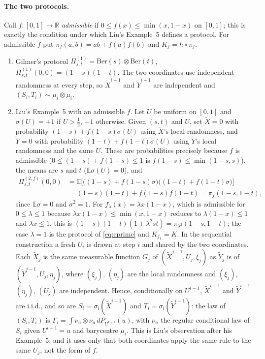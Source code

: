 \documentclass[11pt]{article}
\theoremstyle{plain}
\theoremstyle{definition}
\theoremstyle{remark}
\newcommand{\R}{\mathbb{R}}
\newcommand{\E}{\mathbb{E}}
\begin{document}
\paragraph{The two protocols.}
Call $f:[0,1]\to\R$ \emph{admissible} if $0\le f(x)\le\min(x,1-x)$ on
$[0,1]$; this is exactly the condition under which Liu's Example~5 defines a
protocol.  For admissible $f$ put $\pi_f(a,b)=ab+f(a)f(b)$ and $K_f=h\circ\pi_f$.
\begin{enumerate}[label=(\roman*),nosep]
\item Gilmer's protocol $\Pi^{(1)}_{s,t}=\mathrm{Ber}(s)\otimes\mathrm{Ber}(t)$,
$\Pi^{(1)}_{s,t}(0,0)=(1-s)(1-t)$.  The two coordinates use independent
randomness at every step, so $\tilde X^{i-1}$ and $\tilde Y^{i-1}$ are
independent and $(S_i,T_i)\sim\mu_i\otimes\mu_i$.
\item Liu's Example~5 with an admissible $f$.  Let $U$ be uniform on $[0,1]$
and $\sigma(U)=+1$ if $U>\tfrac12$, $-1$ otherwise.  Given $(s,t)$ and $U$,
set $\tilde X=0$ with probability $(1-s)+f(1-s)\sigma(U)$ using $\tilde X$'s
local randomness, and $\tilde Y=0$ with probability $(1-t)+f(1-t)\sigma(U)$
using $\tilde Y$'s local randomness and the same $U$.  These are
probabilities precisely because $f$ is admissible
($0\le(1-s)\pm f(1-s)\le1$ is $f(1-s)\le\min(1-s,s)$), the means are $s$ and
$t$ ($\E\sigma(U)=0$), and
\begin{align*}
  \Pi^{(2,f)}_{s,t}(0,0)
  &=\E\bigl[\bigl((1-s)+f(1-s)\sigma\bigr)\bigl((1-t)+f(1-t)\sigma\bigr)\bigr]\\
  &=(1-s)(1-t)+f(1-s)f(1-t)=\pi_f(1-s,1-t),
\end{align*}
since $\E\sigma=0$ and $\sigma^2=1$.  For $f_\lambda(x)=\lambda x(1-x)$,
which is admissible for $0\le\lambda\le1$ because
$\lambda x(1-x)\le\min(x,1-x)$ reduces to $\lambda(1-x)\le1$ and
$\lambda x\le1$, this is
$(1-s)(1-t)(1+\lambda^2st)=\pi_{\lambda^2}(1-s,1-t)$; the case $\lambda=1$ is
the protocol of \eqref{eq:cprime} and $K_{f_1}=K$.  In the sequential
construction a fresh
$U_i$ is drawn at step $i$ and shared by the two coordinates.  Each
$\tilde X_j$ is the same measurable function $G_j$ of
$(\tilde X^{j-1},U_j,\xi_j)$ as $\tilde Y_j$ is of $(\tilde Y^{j-1},U_j,\eta_j)$,
where $(\xi_j)$, $(\eta_j)$ are the local randomness and $(\xi_j)$, $(\eta_j)$,
$(U_j)$ are independent.  Hence, conditionally on $U^{i-1}$, $\tilde X^{i-1}$
and $\tilde Y^{i-1}$ are i.i.d., and so are $S_i=\sigma_i(\tilde X^{i-1})$ and
$T_i=\sigma_i(\tilde Y^{i-1})$: the law of $(S_i,T_i)$ is
$\Gamma_i=\int\nu_u\otimes\nu_u\,dP_{U^{i-1}}(u)$, with $\nu_u$ the regular
conditional law of $S_i$ given $U^{i-1}=u$ and barycentre $\mu_i$.  This is
Liu's observation after his Example~5, and it uses only that both coordinates
apply the same rule to the same $U_j$, not the form of $f$.
\end{enumerate}
\end{document}
